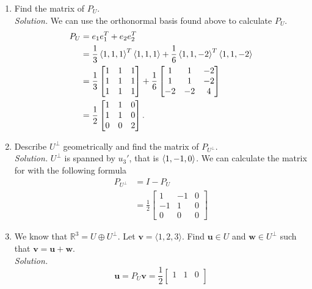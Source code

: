 \documentclass[12pt]{article}
\begin{document}
\begin{enumerate}[label=(\alph*)]
    \item Find the matrix of \(P_{U}\).\\
    \textit{Solution.} We can use the orthonormal basis found above to calculate $P_U$.
	\begin{align*}
		P_U&=e_1e_1^T+e_2e_2^T\\
		&=\frac{1}{3}\left\langle 1,1,1 \right\rangle^T\left\langle 1,1,1 \right\rangle+\frac{1}{6}\left\langle 1,1,-2 \right\rangle^T\left\langle 1,1,-2 \right\rangle\\
		&=\frac{1}{3}
		\begin{bmatrix}
			1&1&1\\
			1&1&1\\
			1&1&1\\
		\end{bmatrix}
		+\frac{1}{6}
		\begin{bmatrix}
			1&1&-2\\
			1&1&-2\\
			-2&-2&4
		\end{bmatrix}\\
		&=\frac{1}{2}
		\begin{bmatrix}
			1&1&0\\
			1&1&0\\
			0&0&2
		\end{bmatrix}.
	\end{align*}
    \item Describe \(U^{\perp}\) geometrically and find the matrix of \(P_{U^{\perp}}\).\\
    \textit{Solution.} $U^\perp$ is spanned by $u_3'$, that is $\left\langle 1,-1,0 \right\rangle$. We can calculate the matrix for with the following formula
	\begin{align*}
		P_{U^\perp}&=I-P_U\\
		&=\frac{1}{2}
		\begin{bmatrix}
			1&-1&0\\
			-1&1&0\\
			0&0&0
		\end{bmatrix}
	\end{align*}
	\newpage
    \item We know that \(\mathbb{R}^{3} = U \oplus U^{\perp}\). Let \(\mathbf{v} = \langle 1, 2, 3 \rangle\). Find \(\mathbf{u} \in U\) and \(\mathbf{w} \in U^{\perp}\) such that \(\mathbf{v} = \mathbf{u} + \mathbf{w}\).\\
    \textit{Solution.}
	\[
		\mathbf{u}=P_U\mathbf{v}=
		\frac{1}{2}
		\begin{bmatrix}
			1&1&0\\

\end{bmatrix}\]
\end{enumerate}
\end{document}
